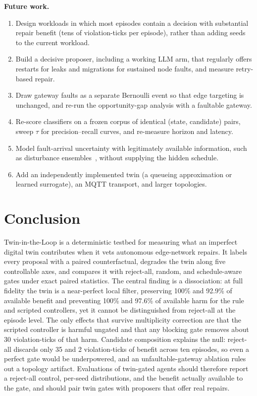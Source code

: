 \documentclass[conference]{IEEEtran}
\begin{document}
\textbf{Future work.}
\begin{enumerate}
  \item Design workloads in which most episodes contain a decision with substantial repair benefit (tens of violation-ticks per episode), rather than adding seeds to the current workload.
  \item Build a decisive proposer, including a working LLM arm, that regularly offers restarts for leaks and migrations for sustained node faults, and measure retry-based repair.
  \item Draw gateway faults as a separate Bernoulli event so that edge targeting is unchanged, and re-run the opportunity-gap analysis with a faultable gateway.
  \item Re-score classifiers on a frozen corpus of identical (state, candidate) pairs, sweep $\tau$ for precision--recall curves, and re-measure horizon and latency.
  \item Model fault-arrival uncertainty with legitimately available information, such as disturbance ensembles~\cite{robustmps,pomcp}, without supplying the hidden schedule.
  \item Add an independently implemented twin (a queueing approximation or learned surrogate), an MQTT transport, and larger topologies.
\end{enumerate}

\section{Conclusion}

Twin-in-the-Loop is a deterministic testbed for measuring what an imperfect digital twin contributes when it vets autonomous edge-network repairs. It labels every proposal with a paired counterfactual, degrades the twin along five controllable axes, and compares it with reject-all, random, and schedule-aware gates under exact paired statistics. The central finding is a dissociation: at full fidelity the twin is a near-perfect local filter, preserving 100\% and 92.9\% of available benefit and preventing 100\% and 97.6\% of available harm for the rule and scripted controllers, yet it cannot be distinguished from reject-all at the episode level. The only effects that survive multiplicity correction are that the scripted controller is harmful ungated and that any blocking gate removes about 30 violation-ticks of that harm. Candidate composition explains the null: reject-all discards only 35 and 2 violation-ticks of benefit across ten episodes, so even a perfect gate would be underpowered, and an unfaultable-gateway ablation rules out a topology artifact. Evaluations of twin-gated agents should therefore report a reject-all control, per-seed distributions, and the benefit actually available to the gate, and should pair twin gates with proposers that offer real repairs.
\end{document}
